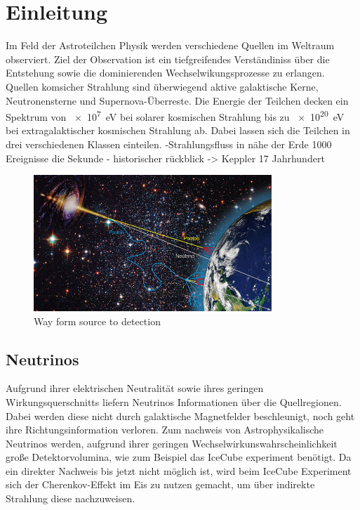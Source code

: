 \chapter{Einleitung}
Im Feld der Astroteilchen Physik werden verschiedene Quellen im Weltraum observiert. Ziel der Observation ist ein tiefgreifendes Verständiniss über die Entstehung sowie die dominierenden Wechselwikungsprozesse zu erlangen. Quellen komsicher Strahlung sind überwiegend aktive galaktische Kerne, Neutronensterne und Supernova-Überreste. Die Energie der Teilchen decken ein Spektrum von \SI{e7}{\electronvolt} bei solarer kosmischen Strahlung bis zu \SI{e20}{\electronvolt} bei extragalaktischer kosmischen Strahlung ab. Dabei lassen sich die Teilchen in drei verschiedenen Klassen einteilen. 
-Strahlungsfluss in nähe der Erde 1000 Ereignisse die Sekunde
- historischer rückblick -> Keppler 17 Jahrhundert 
\begin{figure}
  \centering
  \includegraphics[width=0.8\textwidth]{./logos/sources-detection.jpg}
  \caption{Way form source to detection~\cite{overview-detec}}
\end{figure}

\section{Neutrinos}
Aufgrund ihrer elektrischen Neutralität sowie ihres geringen Wirkungsquerschnitts liefern Neutrinos Informationen über die Quellregionen. Dabei werden diese nicht durch galaktische Magnetfelder beschleunigt, noch geht ihre Richtungsinformation verloren. Zum nachweis von Astrophysikalische Neutrinos werden, aufgrund ihrer geringen Wechselwirkunswahrscheinlichkeit große Detektorvolumina, wie zum Beispiel das IceCube experiment benötigt. Da ein direkter Nachweis bis jetzt nicht möglich ist, wird beim IceCube Experiment sich der Cherenkov-Effekt im Eis zu nutzen gemacht, um über indirekte Strahlung diese nachzuweisen.


